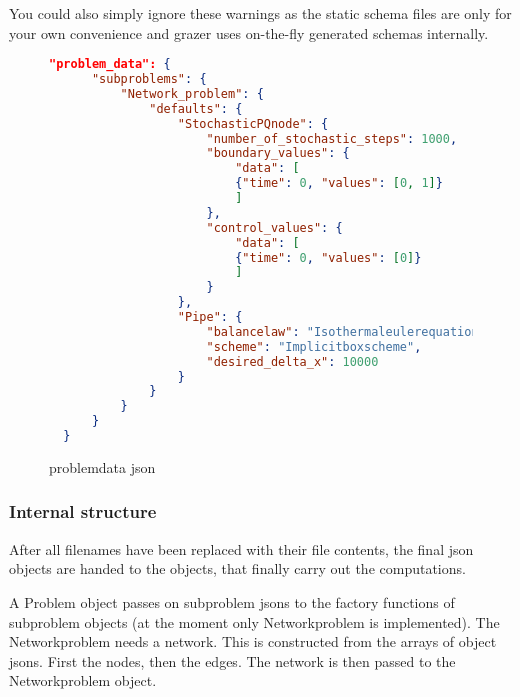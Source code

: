 \documentclass[a4paper]{article}
\newcommand{\sco
}{\textunderscore{}}
\begin{document}
You could also simply ignore
these warnings as the static schema files are only for your own
convenience and grazer uses on-the-fly generated schemas internally.
\begin{figure}[ht]
  \centering
\begin{lstlisting}[language=json,firstnumber=1]
  "problem_data": {
      "subproblems": {
          "Network_problem": {
              "defaults": {
                  "StochasticPQnode": {
                      "number_of_stochastic_steps": 1000,
                      "boundary_values": {
                          "data": [
                          {"time": 0, "values": [0, 1]}
                          ]
                      },
                      "control_values": {
                          "data": [
                          {"time": 0, "values": [0]}
                          ]
                      }
                  },
                  "Pipe": {
                      "balancelaw": "Isothermaleulerequation",
                      "scheme": "Implicitboxscheme",
                      "desired_delta_x": 10000
                  }
              }
          }
      }
  }
\end{lstlisting}
  \caption{problem\sco data json}
  \label{fig:problem_data}
\end{figure}

\subsubsection{Internal structure}
\label{sec:internal-structure}
After all filenames have been replaced with their file contents, the final json objects are handed to the objects, that finally carry out the computations.

A Problem object passes on subproblem jsons to the factory functions of subproblem objects (at the moment only Networkproblem is implemented).
The Networkproblem needs a network.
This is constructed from the arrays of object jsons. First the nodes, then the edges. The network is then passed to the Networkproblem object.
\end{document}
